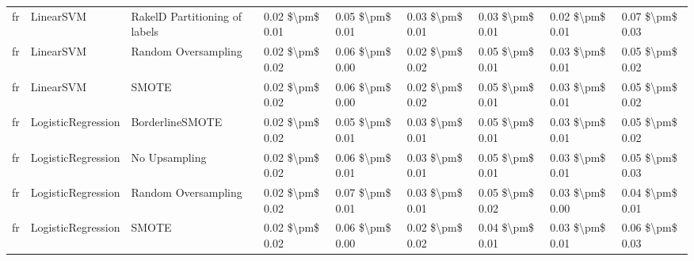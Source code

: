 \begin{tabular}{lllllllll}
      fr &                       LinearSVM & RakelD Partitioning of labels & 0.02 \$\textbackslash pm\$ 0.01 &           0.05 \$\textbackslash pm\$ 0.01 &       0.03 \$\textbackslash pm\$ 0.01 &        0.03 \$\textbackslash pm\$ 0.01 &                         0.02 \$\textbackslash pm\$ 0.01 &     0.07 \$\textbackslash pm\$ 0.03 \\
      fr &                       LinearSVM &           Random Oversampling & 0.02 \$\textbackslash pm\$ 0.02 &           0.06 \$\textbackslash pm\$ 0.00 &       0.02 \$\textbackslash pm\$ 0.02 &        0.05 \$\textbackslash pm\$ 0.01 &                         0.03 \$\textbackslash pm\$ 0.01 &     0.05 \$\textbackslash pm\$ 0.02 \\
      fr &                       LinearSVM &                         SMOTE & 0.02 \$\textbackslash pm\$ 0.02 &           0.06 \$\textbackslash pm\$ 0.00 &       0.02 \$\textbackslash pm\$ 0.02 &        0.05 \$\textbackslash pm\$ 0.01 &                         0.03 \$\textbackslash pm\$ 0.01 &     0.05 \$\textbackslash pm\$ 0.02 \\
      fr &              LogisticRegression &               BorderlineSMOTE & 0.02 \$\textbackslash pm\$ 0.02 &           0.05 \$\textbackslash pm\$ 0.01 &       0.03 \$\textbackslash pm\$ 0.01 &        0.05 \$\textbackslash pm\$ 0.01 &                         0.03 \$\textbackslash pm\$ 0.01 &     0.05 \$\textbackslash pm\$ 0.02 \\
      fr &              LogisticRegression &                 No Upsampling & 0.02 \$\textbackslash pm\$ 0.02 &           0.06 \$\textbackslash pm\$ 0.01 &       0.03 \$\textbackslash pm\$ 0.01 &        0.05 \$\textbackslash pm\$ 0.01 &                         0.03 \$\textbackslash pm\$ 0.01 &     0.05 \$\textbackslash pm\$ 0.03 \\
      fr &              LogisticRegression &           Random Oversampling & 0.02 \$\textbackslash pm\$ 0.02 &           0.07 \$\textbackslash pm\$ 0.01 &       0.03 \$\textbackslash pm\$ 0.01 &        0.05 \$\textbackslash pm\$ 0.02 &                         0.03 \$\textbackslash pm\$ 0.00 &     0.04 \$\textbackslash pm\$ 0.01 \\
      fr &              LogisticRegression &                         SMOTE & 0.02 \$\textbackslash pm\$ 0.02 &           0.06 \$\textbackslash pm\$ 0.00 &       0.02 \$\textbackslash pm\$ 0.02 &        0.04 \$\textbackslash pm\$ 0.01 &                         0.03 \$\textbackslash pm\$ 0.01 &     0.06 \$\textbackslash pm\$ 0.03 \\

\end{tabular}
